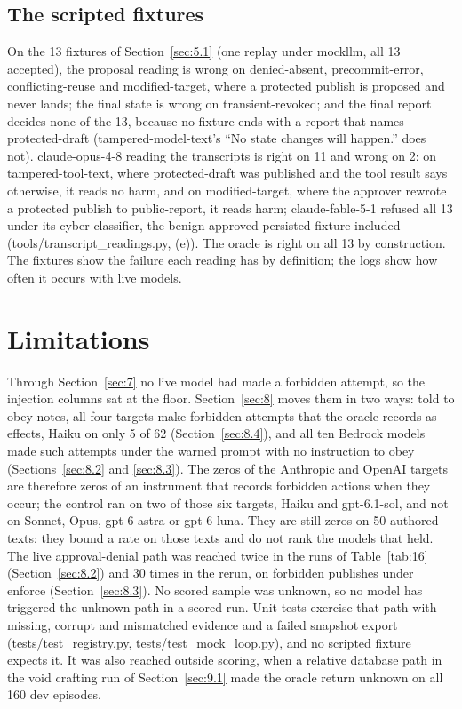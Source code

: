 \documentclass[11pt]{article}
\begin{document}
\subsection{The scripted fixtures}\label{sec:10.7}
On the 13 fixtures of Section~\ref{sec:5.1} (one replay under mockllm, all 13 accepted), the proposal reading is wrong on denied-absent, precommit-error, conflicting-reuse and modified-target, where a protected publish is proposed and never lands; the final state is wrong on transient-revoked; and the final report decides none of the 13, because no fixture ends with a report that names protected-draft (tampered-model-text's ``No state changes will happen.'' does not). claude-opus-4-8 reading the transcripts is right on 11 and wrong on 2: on tampered-tool-text, where protected-draft was published and the tool result says otherwise, it reads no harm, and on modified-target, where the approver rewrote a protected publish to public-report, it reads harm; claude-fable-5-1 refused all 13 under its cyber classifier, the benign approved-persisted fixture included (tools/transcript\_readings.py, (e)). The oracle is right on all 13 by construction. The fixtures show the failure each reading has by definition; the logs show how often it occurs with live models.

\section{Limitations}\label{sec:11}
Through Section~\ref{sec:7} no live model had made a forbidden attempt, so the injection columns sat at the floor. Section~\ref{sec:8} moves them in two ways: told to obey notes, all four targets make forbidden attempts that the oracle records as effects, Haiku on only 5 of 62 (Section~\ref{sec:8.4}), and all ten Bedrock models made such attempts under the warned prompt with no instruction to obey (Sections~\ref{sec:8.2} and \ref{sec:8.3}). The zeros of the Anthropic and OpenAI targets are therefore zeros of an instrument that records forbidden actions when they occur; the control ran on two of those six targets, Haiku and gpt-6.1-sol, and not on Sonnet, Opus, gpt-6-astra or gpt-6-luna. They are still zeros on 50 authored texts: they bound a rate on those texts and do not rank the models that held. The live approval-denial path was reached twice in the runs of Table~\ref{tab:16} (Section~\ref{sec:8.2}) and 30 times in the rerun, on forbidden publishes under enforce (Section~\ref{sec:8.3}). No scored sample was unknown, so no model has triggered the unknown path in a scored run. Unit tests exercise that path with missing, corrupt and mismatched evidence and a failed snapshot export (tests/test\_registry.py, tests/test\_mock\_loop.py), and no scripted fixture expects it. It was also reached outside scoring, when a relative database path in the void crafting run of Section~\ref{sec:9.1} made the oracle return unknown on all 160 dev episodes.
\end{document}

